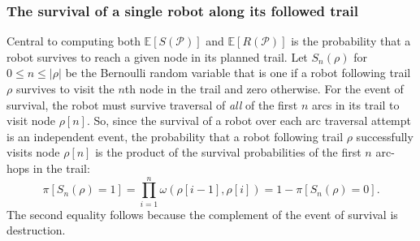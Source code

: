 \documentclass[11pt, oneside]{article}
\begin{document}
\subsubsection{The survival of a single robot along its followed trail}
Central to computing both $\mathbb{E}[S(\mathcal{P})]$ and $\mathbb{E}[R(\mathcal{P})]$ is the probability that a robot survives to reach a given node in its planned trail.
Let $S_n(\rho)$ for $0 \leq n \leq \lvert \rho \rvert$ be the Bernoulli random variable that is one if a robot following trail $\rho$ survives to visit the $n$th node in the trail and zero otherwise. 
For the event of survival, the robot must survive traversal of \emph{all} of the first $n$ arcs in its trail to visit node $\rho[n]$. So, since the survival of a robot over each arc traversal attempt is an independent event, the probability that a robot following trail $\rho$ successfully visits node $\rho[n]$ is the product of the survival probabilities of the first $n$ arc-hops in the trail:
\begin{equation}
	\pi[S_n(\rho) = 1] = \prod_{i=1}^n \omega(\rho[i-1], \rho[i]) 
	= 1 - \pi[S_n(\rho) = 0]. \label{eq:pi_S_n}
\end{equation} %
The second equality follows because the complement of the event of survival is destruction.
\end{document}
